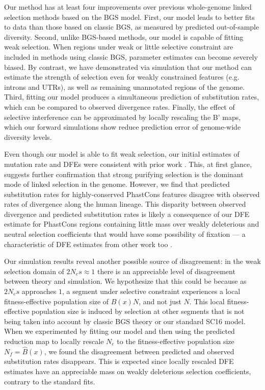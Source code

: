\documentclass[11pt]{article}
\begin{document}
Our method has at least four improvements over previous whole-genome linked selection methods based on the BGS model. First, our model leads to better fits to data than those based on classic BGS, as measured by predicted out-of-sample diversity. Second, unlike BGS-based methods, our model is capable of fitting weak selection. When regions under weak or little selective constraint are included in methods using classic BGS, parameter estimates can become severely biased. By contrast, we have demonstrated via simulation that our method can estimate the strength of selection even for weakly constrained features (e.g. introns and UTRs), as well as remaining unannotated regions of the genome. Third, fitting our model produces a simultaneous prediction of substitution rates, which can be compared to observed divergence rates. Finally, the effect of selective interference can be approximated by locally rescaling the B' maps, which our forward simulations show reduce prediction error of genome-wide diversity levels.

Even though our model is able to fit weak selection, our initial estimates of mutation rate and DFEs were consistent with prior work \parencite{Murphy2022-sj}. This, at first glance, suggests further confirmation that strong purifying selection is the dominant mode of linked selection in the genome. However, we find that predicted substitution rates for highly-conserved PhastCons features disagree with observed rates of divergence along the human lineage. This disparity between observed divergence and predicted substitution rates is likely a consequence of our DFE estimate for PhastCons regions containing little mass over weakly deleterious and neutral selection coefficients that would have some possibility of fixation --- a characteristic of DFE estimates from other work too \parencite{Murphy2022-sj}.

Our simulation results reveal another possible source of disagreement: in the weak selection domain of $2N_e s \approx 1$ there is an appreciable level of disagreement between theory and simulation. We hypothesize that this could be because as $2N_e s$ approaches $1$, a segment under
selective constraint experiences a local fitness-effective population size of $B(x)N$, and not just $N$. This local fitness-effective population size is induced by selection at other segments that is not being taken into account by classic BGS theory or our standard SC16 model. When we experimented by fitting our model and then using the predicted reduction map to locally rescale $N_e$ to the fitness-effective population size $N_f = \widehat{B}(x)$, we found the disagreement between predicted and observed substitution rates disappears. This is expected since locally rescaled DFE estimates have an appreciable mass on weakly deleterious selection coefficients, contrary to the standard fits.
\end{document}
